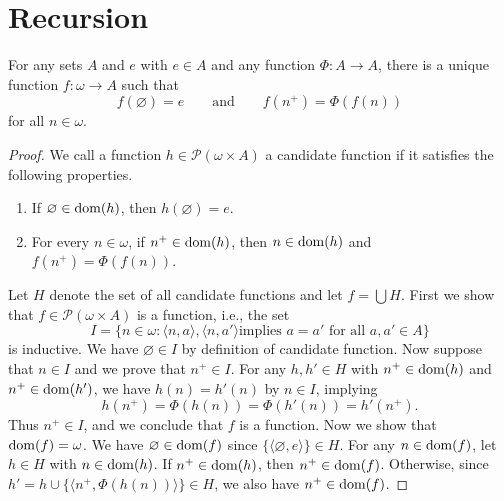 \section{Recursion}
\begin{theorem}
  For any sets $A$ and $e$ with $e \in A$ and any function $\Phi: A \to A$,
  there is a unique function $f: \omega \to A$ such that
  \begin{equation*}
    f(\varnothing) = e
    \qquad \text{and} \qquad
    f(n^+) = \Phi(f(n))
  \end{equation*}
  for all $n \in \omega$.
\end{theorem}
\begin{proof}
  We call a function $h \in \mathcal{P}(\omega \times A)$ a candidate function
  if it satisfies the following properties.
  \begin{enumerate}[1.]
    \item If $\varnothing \in \operatorname{dom}(h)$, then $h(\varnothing) = e$.
    \item For every $n \in \omega$, if $n^+ \in \operatorname{dom}(h)$, then $n \in \operatorname{dom}(h)$
    and $f(n^+) = \Phi(f(n))$.
  \end{enumerate}
  Let $H$ denote the set of all candidate functions and let $f = \bigcup H$.
  First we show that $f \in \mathcal{P}(\omega \times A)$ is a function,
  i.e., the set
  \begin{equation*}
    I = \{n \in \omega: \text{$\langle n, a \rangle, \langle n, a' \rangle$
    implies $a = a'$ for all $a, a' \in A$}\}
  \end{equation*}
  is inductive.
  We have $\varnothing \in I$ by definition of candidate function.
  Now suppose that $n \in I$ and we prove that $n^+ \in I$.
  For any $h, h' \in H$ with $n^+ \in \operatorname{dom}(h)$ and $n^+ \in \operatorname{dom}(h')$, we have
  $h(n) = h'(n)$ by $n \in I$, implying
  \begin{equation*}
    h(n^+) = \Phi(h(n)) = \Phi(h'(n)) = h'(n^+).
  \end{equation*}
  Thus $n^+ \in I$, and we conclude that $f$ is a function.
  Now we show that $\operatorname{dom}(f) = \omega$.
  We have $\varnothing \in \operatorname{dom}(f)$ since $\{\langle \varnothing, e \rangle\}
  \in H$.
  For any $n \in \operatorname{dom}(f)$, let $h \in H$ with $n \in \operatorname{dom}(h)$.
  If $n^+ \in \operatorname{dom}(h)$, then $n^+ \in \operatorname{dom}(f)$.
  Otherwise, since $h' = h \cup \{\langle n^+, \Phi(h(n)) \rangle\} \in H$, we
  also have $n^+ \in \operatorname{dom}(f)$.


\end{proof}
